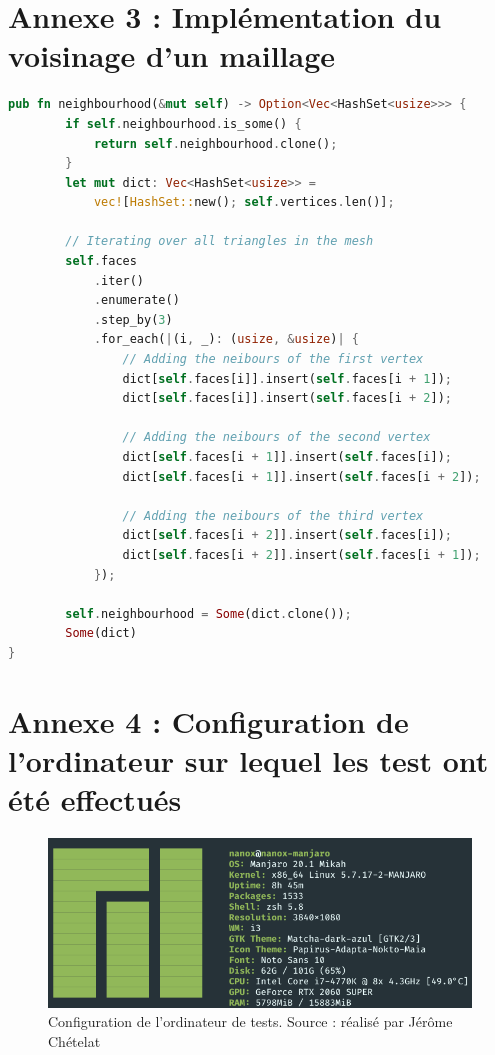 \chapter*{Annexe 3 : Implémentation du voisinage d'un maillage}

\begin{lstlisting}[language=Rust, style=boxed]
pub fn neighbourhood(&mut self) -> Option<Vec<HashSet<usize>>> {
        if self.neighbourhood.is_some() {
            return self.neighbourhood.clone();
        }
        let mut dict: Vec<HashSet<usize>> = 
            vec![HashSet::new(); self.vertices.len()];

        // Iterating over all triangles in the mesh
        self.faces
            .iter()
            .enumerate()
            .step_by(3)
            .for_each(|(i, _): (usize, &usize)| {
                // Adding the neibours of the first vertex
                dict[self.faces[i]].insert(self.faces[i + 1]);
                dict[self.faces[i]].insert(self.faces[i + 2]);

                // Adding the neibours of the second vertex
                dict[self.faces[i + 1]].insert(self.faces[i]);
                dict[self.faces[i + 1]].insert(self.faces[i + 2]);

                // Adding the neibours of the third vertex
                dict[self.faces[i + 2]].insert(self.faces[i]);
                dict[self.faces[i + 2]].insert(self.faces[i + 1]);
            });

        self.neighbourhood = Some(dict.clone());
        Some(dict)
}
\end{lstlisting}

\chapter*{Annexe 4 : Configuration de l'ordinateur sur lequel les test ont été
effectués}
\begin{figure}[htbp!]
    \centering
    \includegraphics[width=0.8\linewidth]{figures/configs.png}
    \caption{Configuration de l'ordinateur de tests. Source : réalisé par Jérôme Chételat}
	\label{fig:computer_configuration}
\end{figure}

